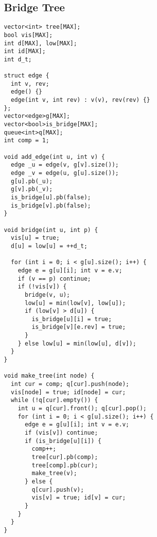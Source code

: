 \documentclass[10pt,a4paper,onesided]{article}
\begin{document}
\begin{multicols*}{3}
\subsection{Bridge Tree}
\begin{lstlisting}
vector<int> tree[MAX];
bool vis[MAX];
int d[MAX], low[MAX];
int id[MAX];
int d_t;

struct edge {
  int v, rev;
  edge() {}
  edge(int v, int rev) : v(v), rev(rev) {}
};
vector<edge>g[MAX];
vector<bool>is_bridge[MAX];
queue<int>q[MAX];
int comp = 1;

void add_edge(int u, int v) {
  edge _u = edge(v, g[v].size());
  edge _v = edge(u, g[u].size());
  g[u].pb(_u);
  g[v].pb(_v);
  is_bridge[u].pb(false);
  is_bridge[v].pb(false);
}

void bridge(int u, int p) {
  vis[u] = true;
  d[u] = low[u] = ++d_t;

  for (int i = 0; i < g[u].size(); i++) {
    edge e = g[u][i]; int v = e.v;
    if (v == p) continue;
    if (!vis[v]) {
      bridge(v, u);
      low[u] = min(low[v], low[u]);
      if (low[v] > d[u]) {
        is_bridge[u][i] = true;
        is_bridge[v][e.rev] = true;
      }
    } else low[u] = min(low[u], d[v]);
  }
}

void make_tree(int node) {
  int cur = comp; q[cur].push(node);
  vis[node] = true; id[node] = cur;
  while (!q[cur].empty()) {
    int u = q[cur].front(); q[cur].pop();
    for (int i = 0; i < g[u].size(); i++) {
      edge e = g[u][i]; int v = e.v;
      if (vis[v]) continue;
      if (is_bridge[u][i]) {
        comp++;
        tree[cur].pb(comp);
        tree[comp].pb(cur);
        make_tree(v);
      } else {
        q[cur].push(v);
        vis[v] = true; id[v] = cur;
      }
    }
  }
}
\end{lstlisting}

\end{multicols*}
\end{document}
